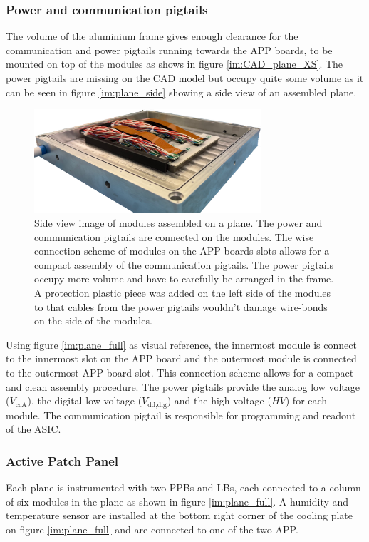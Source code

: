 				\subsubsection{Power and communication pigtails} 
				The volume of the aluminium frame gives enough clearance for the communication and power pigtails running towards the APP boards, to be mounted on top of the modules as shows in figure \ref{im:CAD_plane_XS}. The power pigtails are missing on the CAD model but occupy quite some volume as it can be seen in figure \ref{im:plane_side} showing a side view of an assembled plane. 
					\begin{figure}[h]
						\centering
						\includegraphics[width=0.75\textwidth]{files/plane_side-view}
						\caption{Side view image of modules assembled on a plane. The power and communication pigtails are connected on the modules. The wise connection scheme of modules on the APP boards slots allows for a compact assembly of the communication pigtails. The power pigtails occupy more volume and have to carefully be arranged in the frame. A protection plastic piece was added on the left side of the modules to that cables from the power pigtails wouldn't damage wire-bonds on the side of the modules. }
						\label{im:plane_side-view}
					\end{figure}
					Using figure \ref{im:plane_full} as visual reference, the innermost module is connect to the innermost slot on the APP board and the outermost module is connected to the outermost APP board slot. This connection scheme allows for a compact and clean assembly procedure. The power pigtails provide the analog low voltage ($V_{\text{ccA}}$), the digital low voltage ($V_{\text{dd,dig}}$) and the high voltage ($HV$) for each module. The communication pigtail is responsible for programming and readout of the ASIC. 
				
				
				\subsubsection{Active Patch Panel} 
				Each plane is instrumented with two PPBs and LBs, each connected to a column of six modules in the plane as shown in figure \ref{im:plane_full}. A humidity and temperature sensor are installed at the bottom right corner of the cooling plate on figure \ref{im:plane_full} and are connected to one of the two APP. 
			
